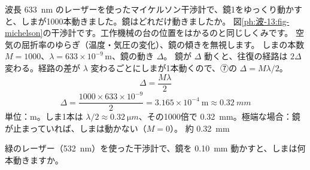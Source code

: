 \begin{phreidai}[干渉計で鏡の動きをはかる]
\label{ph:波-13:ex12}波長 \qty{633}{nm} のレーザーを使ったマイケルソン干渉計で、鏡1をゆっくり動かすと、しまが1000本動きました。鏡はどれだけ動きましたか。
\phbamen
図\ref{ph:波-13:fig-michelson}の干渉計です。工作機械の台の位置をはかるのと同じしくみです。
\phmushi
空気の屈折率のゆらぎ（温度・気圧の変化）、鏡の傾きを無視します。
\phzu
しまの本数 $M=1000$、$\lambda=633\times10^{-9}$\,m、鏡の動き $\Delta$。
\phriyu
鏡が $\Delta$ 動くと、往復の経路は $2\Delta$ 変わる。経路の差が $\lambda$ 変わるごとにしまが1本動くので、⑦の $\Delta=M\lambda/2$。
\phtateru
\[ \Delta=\frac{M\lambda}{2} \]
\phtoku
\[ \Delta=\frac{1000\times633\times10^{-9}}{2}=3.165\times10^{-4}\ \mathrm{m}\approx\qty{0.32}{mm} \]
\phtashikame
単位：m。しま1本は $\lambda/2\approx\qty{0.32}{\micro m}$、その1000倍で \qty{0.32}{mm}。極端な場合：鏡が止まっていれば、しまは動かない（$M=0$）。
\kotae 約 \qty{0.32}{mm}
\end{phreidai}
\begin{jibun}
緑のレーザー（\qty{532}{nm}）を使った干渉計で、鏡を \qty{0.10}{mm} 動かすと、しまは何本動きますか。
\end{jibun}

